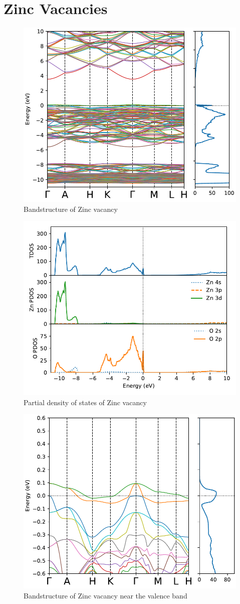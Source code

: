 \clearpage


\section{Zinc Vacancies}
\begin{figure}[tbh!]
	\centering
	\includegraphics[width=0.6\linewidth]{"images/rnd/band-dos_Zn_vac"}
	\caption[Bandstructure of Zinc vacancy]{Bandstructure of Zinc vacancy}
\end{figure}

\begin{figure}[tbh!]
	\centering
	\includegraphics[width=0.6\linewidth]{"images/rnd/dos-pdos_Zn_vac"}
	\caption[Partial density of states of Zinc vacancy]{Partial density of states of Zinc vacancy}
\end{figure}

\begin{figure}[tbh!]
	\centering
	\includegraphics[width=0.6\linewidth]{"images/rnd/band-dos-close_Zn_vac"}
	\caption[Bandstructure of Zinc vacancy near the valence band]{Bandstructure of Zinc vacancy near the valence band}
\end{figure}

